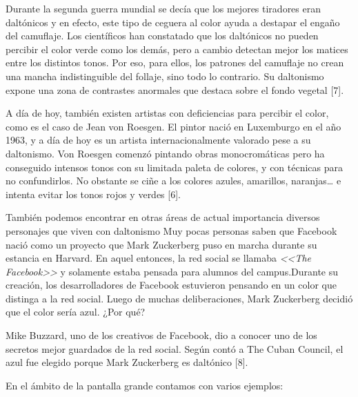 \documentclass[10pt]{article}
\begin{document}
Durante la segunda guerra mundial se decía que los mejores tiradores eran daltónicos y en efecto, este tipo de ceguera al color ayuda a destapar el engaño del camuflaje. Los científicos han constatado que los daltónicos no pueden percibir el color verde como los demás, pero a cambio detectan mejor los matices entre los distintos tonos. Por eso, para ellos, los patrones del camuflaje no crean una mancha indistinguible del follaje, sino todo lo contrario. Su daltonismo expone una zona de contrastes anormales que destaca sobre el fondo vegetal [7].

\setlength{\parskip}{2mm}

A día de hoy, también existen artistas con deficiencias para percibir el color, como es el caso de Jean von Roesgen. El pintor nació en Luxemburgo en el año 1963, y a día de hoy es un artista internacionalmente valorado pese a su daltonismo. Von Roesgen comenzó pintando obras monocromáticas pero ha conseguido intensos tonos con su limitada paleta de colores, y con técnicas para no confundirlos. No obstante se ciñe a los colores azules, amarillos, naranjas… e intenta evitar los tonos rojos y verdes [6].

\setlength{\parskip}{2mm}

También podemos encontrar en otras áreas de actual importancia diversos personajes que viven con daltonismo 
Muy pocas personas saben que Facebook nació como un proyecto que Mark Zuckerberg puso en marcha durante su estancia en Harvard. En aquel entonces, la red social se llamaba \textit{ <<The Facebook>>} y solamente estaba pensada para alumnos del campus.Durante su creación, los desarrolladores de Facebook estuvieron pensando en un color que distinga a la red social. Luego de muchas deliberaciones, Mark Zuckerberg decidió que el color sería azul. ¿Por qué?

\setlength{\parskip}{2mm}

Mike Buzzard, uno de los creativos de Facebook, dio a conocer uno de los secretos mejor guardados de la red social. Según contó a The Cuban Council, el azul fue elegido porque Mark Zuckerberg es daltónico [8].

\setlength{\parskip}{2mm}

En el ámbito de la pantalla grande contamos con varios ejemplos: 
\end{document}
